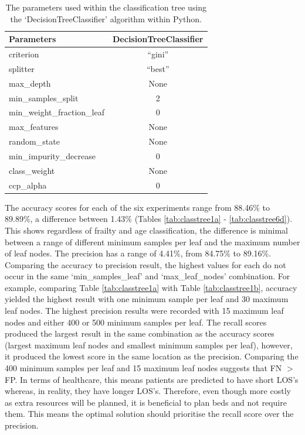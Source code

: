 \documentclass[../thesis.tex]{subfiles}
\begin{document}
\begin{table}[h!]
    \centering
    \begin{tabular}{lc}\toprule
      \textbf{Parameters}   & \textbf{DecisionTreeClassifier} \\\midrule
       criterion  & ``gini'' \\
       splitter & ``best'' \\
       max\_depth & None \\
       min\_samples\_split & 2 \\
       min\_weight\_fraction\_leaf & 0\\
       max\_features & None \\
       random\_state & None \\
       min\_impurity\_decrease & 0\\
       class\_weight & None \\
       ccp\_alpha &0\\ \bottomrule
    \end{tabular}
    \caption{The parameters used within the classification tree using the `DecisionTreeClassifier' algorithm within Python.}
    \label{tab:paramforclass}
\end{table}

The accuracy scores for each of the six experiments range from 88.46\% to 89.89\%, a difference between 1.43\% (Tables \ref{tab:classtree1a} - \ref{tab:classtree6d}). This shows regardless of frailty and age classification, the difference is minimal between a range of different minimum samples per leaf and the maximum number of leaf nodes. The precision has a range of 4.41\%, from 84.75\% to 89.16\%. Comparing the accuracy to precision result, the highest values for each do not occur in the same `min\_samples\_leaf' and `max\_leaf\_nodes' combination. For example, comparing Table \ref{tab:classtree1a} with Table \ref{tab:classtree1b}, accuracy yielded the highest result with one minimum sample per leaf and 30 maximum leaf nodes. The highest precision results were recorded with 15 maximum leaf nodes and either 400 or 500 minimum samples per leaf. The recall scores produced the largest result in the same combination as the accuracy scores (largest maximum leaf nodes and smallest minimum samples per leaf), however, it produced the lowest score in the same location as the precision. Comparing the 400 minimum samples per leaf and 15 maximum leaf nodes suggests that FN $>$ FP. In terms of healthcare, this means patients are predicted to have short LOS's whereas, in reality, they have longer LOS's. Therefore, even though more costly as extra resources will be planned, it is beneficial to plan beds and not require them. This means the optimal solution should prioritise the recall score over the precision.
\end{document}
